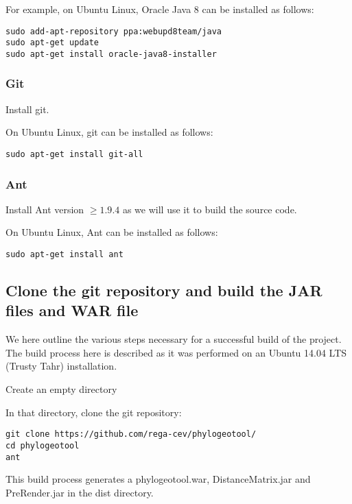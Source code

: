 \documentclass[a4paper, 11pt]{article} %
\begin{document}
For example, on Ubuntu Linux, Oracle Java 8 can be installed as follows:
\begin{verbatim} 
sudo add-apt-repository ppa:webupd8team/java
sudo apt-get update
sudo apt-get install oracle-java8-installer
\end{verbatim}

\subsubsection*{Git}
Install git.

On Ubuntu Linux, git can be installed as follows:
\begin{verbatim}
sudo apt-get install git-all
\end{verbatim}

\subsubsection*{Ant}
Install Ant version $\geq 1.9.4$ as we will use it to build the source code.

On Ubuntu Linux, Ant can be installed as follows:
\begin{verbatim}
sudo apt-get install ant
\end{verbatim}

\subsection{Clone the git repository and build the JAR files and WAR file}
We here outline the various steps necessary for a successful build of the project.
The build process here is described as it was performed on an Ubuntu 14.04 LTS (Trusty Tahr) installation.
\begin{itemize}
\item Create an empty directory
\item {In that directory, clone the git repository: 
\begin{verbatim}
git clone https://github.com/rega-cev/phylogeotool/
cd phylogeotool
ant
\end{verbatim}
\item This build process generates a phylogeotool.war, DistanceMatrix.jar and PreRender.jar in the dist directory.
}
\end{itemize}
\end{document}
